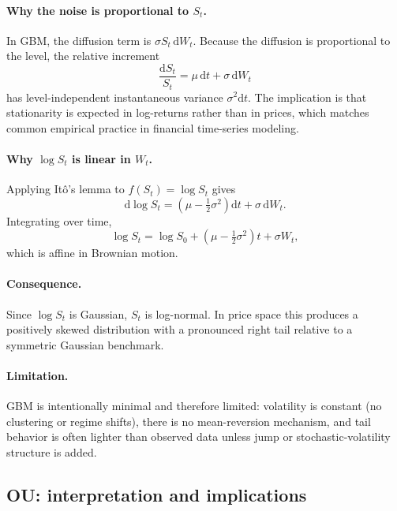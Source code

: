 \documentclass[11pt]{article}
\newcommand{\dd}{\mathrm{d}}
\begin{document}
\paragraph{Why the noise is proportional to $S_t$.}
In GBM, the diffusion term is $\sigma S_t\,\dd W_t$. Because the diffusion is proportional to the level, the relative increment
\begin{equation}
  \frac{\dd S_t}{S_t} = \mu\,\dd t + \sigma\,\dd W_t
\end{equation}
has level-independent instantaneous variance $\sigma^2\dd t$. The implication is that stationarity is expected in log-returns rather than in prices, which matches common empirical practice in financial time-series modeling.

\paragraph{Why $\log S_t$ is linear in $W_t$.}
Applying It\^o's lemma to $f(S_t)=\log S_t$ gives
\begin{equation}
  \dd \log S_t = \left(\mu - \tfrac{1}{2}\sigma^2\right)\dd t + \sigma\,\dd W_t.
\end{equation}
Integrating over time,
\begin{equation}
  \log S_t = \log S_0 + \left(\mu - \tfrac{1}{2}\sigma^2\right)t + \sigma W_t,
\end{equation}
which is affine in Brownian motion.

\paragraph{Consequence.}
Since $\log S_t$ is Gaussian, $S_t$ is log-normal. In price space this produces a positively skewed distribution with a pronounced right tail relative to a symmetric Gaussian benchmark.

\paragraph{Limitation.}
GBM is intentionally minimal and therefore limited: volatility is constant (no clustering or regime shifts), there is no mean-reversion mechanism, and tail behavior is often lighter than observed data unless jump or stochastic-volatility structure is added.

\subsection{OU: interpretation and implications}
\end{document}
